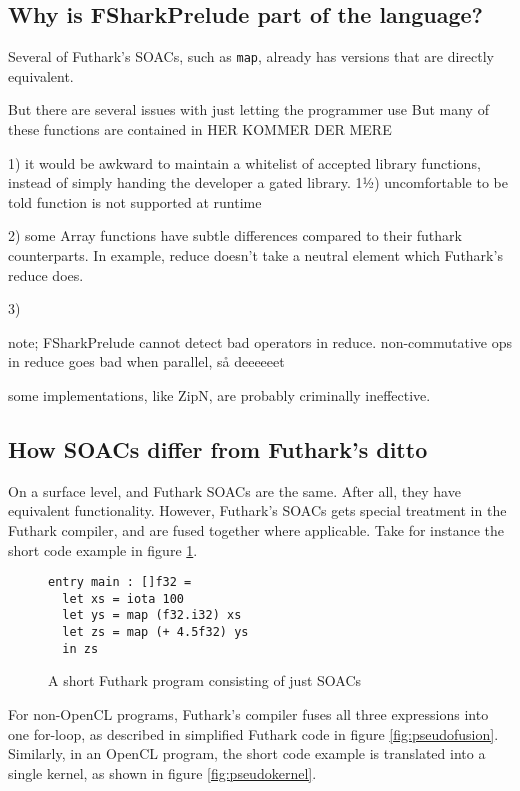 

\subsection*{Why is FSharkPrelude part of the \fshark{} language?}
Several of Futhark's SOACs, such as \texttt{map}, already has \fsharp{}
versions that are directly equivalent.

But there are several issues with just letting the \fshark{} programmer use 
But many of these \fsharp{} functions are
contained in 
HER KOMMER DER MERE

 1) it would be awkward to maintain a whitelist of accepted library functions,
 instead of simply handing the developer a gated library.
 1½) uncomfortable to be told function is not supported at runtime 

 2) some Array functions have subtle differences compared to their
 futhark counterparts. In example, reduce doesn't take a neutral element which
 Futhark's reduce does.

 3)


 note; FSharkPrelude cannot detect bad operators in reduce. non-commutative ops
 in reduce goes bad when parallel, så deeeeeet


 some implementations, like ZipN, are probably criminally ineffective.

 \subsection*{How \fshark{} SOACs differ from Futhark's ditto}
On a surface level, \fshark{} and Futhark SOACs are the same. After all, they
have equivalent functionality.
However, Futhark's SOACs gets special treatment in the Futhark compiler, and are
fused together where applicable.
Take for instance the short code example in figure \ref{fig:futharkfusion}.

\begin{figure}[h]
  \centering
\begin{lstlisting}[language=Futhark]
entry main : []f32 =
  let xs = iota 100
  let ys = map (f32.i32) xs
  let zs = map (+ 4.5f32) ys
  in zs
\end{lstlisting}
  \caption{A short Futhark program consisting of just SOACs}
  \label{fig:futharkfusion}
\end{figure}

For non-OpenCL programs, Futhark's compiler fuses all three expressions into one for-loop, as described
in simplified Futhark \csharp{} code in figure \ref{fig:pseudofusion}.
Similarly, in an OpenCL program, the short code example is translated into a
single kernel, as shown in figure \ref{fig:pseudokernel}.

